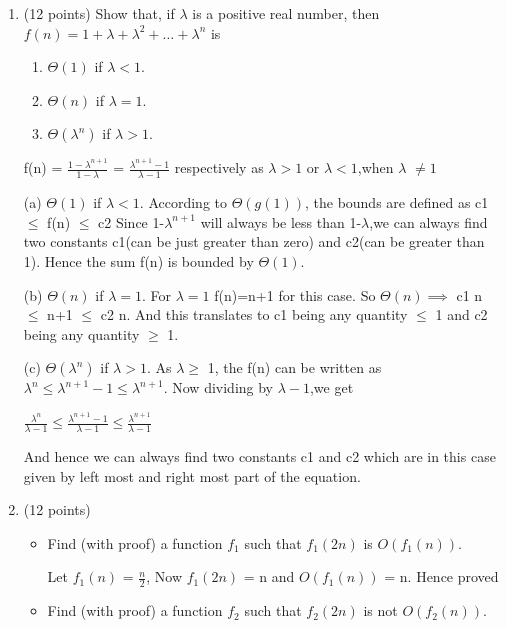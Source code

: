\documentclass[11pt]{article}
\begin{document}
\begin{enumerate}
\newpage


\item (12 points)
Show that, if $\lambda$ is a positive real number, then $f(n)= 1+ \lambda + \lambda^2 + \ldots + \lambda^n$ is
\begin{enumerate}  
\item $\Theta(1)$ if $\lambda<1$. 
\item $\Theta(n)$ if $\lambda=1$.
\item $\Theta(\lambda^n)$ if $\lambda>1$.
\end{enumerate}
\begin{center}
f(n) = $\frac{1 - \lambda^{n+1}}{1-\lambda }$ = $\frac{ \lambda^{n+1}-1 }{\lambda -1 }$ respectively as $\lambda >1$ or $\lambda <1$,when $\lambda$ $\neq 1$ 
\end{center}
(a) $\Theta(1)$ if $\lambda<1$. According to $\Theta{(g(1))} $,
the bounds are defined as c1 $\leq$ f(n) $\leq$ c2
Since 1-$\lambda^{n+1}$ will always be less than 1-$\lambda$,we can always find two constants c1(can be just greater than zero) and c2(can be greater than 1). Hence the sum f(n) is bounded by $\Theta(1).$ 

(b) $\Theta(n)$ if $\lambda=1$. For $\lambda=1$ 
f(n)=n+1 for this case. So $\Theta{(n)} \implies$
c1 n $\leq$ n+1 $\leq$ c2 n.
And this translates to c1 being any quantity $\leq$ 1 and c2 being any quantity $\geq$ 1.

(c) $\Theta(\lambda^n)$ if $\lambda>1$. As $\lambda \geq$ 1, the f(n) can be written as $\lambda^n \leq \lambda^{n+1} -1 \leq \lambda^{n+1}$. Now dividing by $\lambda -1$,we get 
\begin{center}
$\frac {\lambda^n}{\lambda -1} \leq 
\frac {\lambda^{n+1}-1}{\lambda -1} \leq \frac {\lambda^{n+1}}{\lambda -1}$
\end{center}
And hence we can always find two constants c1 and c2 which are in this case given by left most and right most part of the equation.

\bigskip

\item (12 points)
\begin{itemize}
\item Find (with proof) a function $f_1$ such that $f_1(2n)$  is $O(f_1(n))$. 

Let $f_1(n)$ = $\frac{n}{2}$, Now $f_1(2n)$ = n and $O(f_1(n))$ = n. Hence proved
\item Find (with proof) a function $f_2$ such that $f_2(2n)$  is not $O(f_2(n))$.


\end{itemize}
\end{enumerate}
\end{document}
